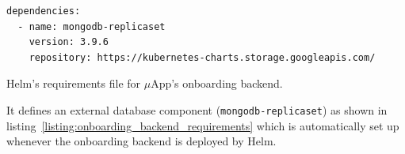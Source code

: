 \begin{listing}[H]
  \begin{verbatim}
dependencies:
  - name: mongodb-replicaset
    version: 3.9.6
    repository: https://kubernetes-charts.storage.googleapis.com/
  \end{verbatim}
  \caption{Helm's requirements file for $\mu$App's onboarding backend.}%
  \label{listing:onboarding_backend_requirements}
\end{listing}

It defines an external database component (\texttt{mongodb-replicaset}) as
shown in listing~\ref{listing:onboarding_backend_requirements} which is
automatically set up whenever the onboarding backend is deployed by Helm.
